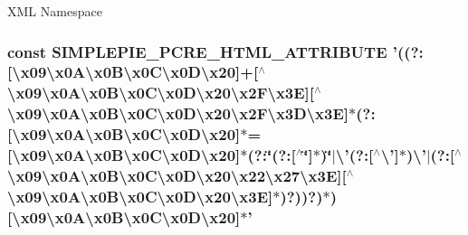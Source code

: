 X\-M\-L Namespace \hypertarget{simplepie_8inc_ae8d34a93fac87ed8c4090acddfcf9d67}{
\subsubsection[{S\-I\-M\-P\-L\-E\-P\-I\-E\-\_\-\-P\-C\-R\-E\-\_\-\-H\-T\-M\-L\-\_\-\-A\-T\-T\-R\-I\-B\-U\-T\-E}]{\setlength{\rightskip}{0pt plus 5cm}const S\-I\-M\-P\-L\-E\-P\-I\-E\-\_\-\-P\-C\-R\-E\-\_\-\-H\-T\-M\-L\-\_\-\-A\-T\-T\-R\-I\-B\-U\-T\-E '((?\-:\mbox{[}\textbackslash{}x09\textbackslash{}x0\-A\textbackslash{}x0\-B\textbackslash{}x0\-C\textbackslash{}x0\-D\textbackslash{}x20\mbox{]}+\mbox{[}$^\wedge$\textbackslash{}x09\textbackslash{}x0\-A\textbackslash{}x0\-B\textbackslash{}x0\-C\textbackslash{}x0\-D\textbackslash{}x20\textbackslash{}x2\-F\textbackslash{}x3\-E\mbox{]}\mbox{[}$^\wedge$\textbackslash{}x09\textbackslash{}x0\-A\textbackslash{}x0\-B\textbackslash{}x0\-C\textbackslash{}x0\-D\textbackslash{}x20\textbackslash{}x2\-F\textbackslash{}x3\-D\textbackslash{}x3\-E\mbox{]}$\ast$(?\-:\mbox{[}\textbackslash{}x09\textbackslash{}x0\-A\textbackslash{}x0\-B\textbackslash{}x0\-C\textbackslash{}x0\-D\textbackslash{}x20\mbox{]}$\ast$=\mbox{[}\textbackslash{}x09\textbackslash{}x0\-A\textbackslash{}x0\-B\textbackslash{}x0\-C\textbackslash{}x0\-D\textbackslash{}x20\mbox{]}$\ast$(?\-:\char`\"{}(?\-:\mbox{[}$^\wedge$\char`\"{}\mbox{]}$\ast$)\char`\"{}$|$\textbackslash{}'(?\-:\mbox{[}$^\wedge$\textbackslash{}'\mbox{]}$\ast$)\textbackslash{}'$|$(?\-:\mbox{[}$^\wedge$\textbackslash{}x09\textbackslash{}x0\-A\textbackslash{}x0\-B\textbackslash{}x0\-C\textbackslash{}x0\-D\textbackslash{}x20\textbackslash{}x22\textbackslash{}x27\textbackslash{}x3\-E\mbox{]}\mbox{[}$^\wedge$\textbackslash{}x09\textbackslash{}x0\-A\textbackslash{}x0\-B\textbackslash{}x0\-C\textbackslash{}x0\-D\textbackslash{}x20\textbackslash{}x3\-E\mbox{]}$\ast$)?))?)$\ast$)\mbox{[}\textbackslash{}x09\textbackslash{}x0\-A\textbackslash{}x0\-B\textbackslash{}x0\-C\textbackslash{}x0\-D\textbackslash{}x20\mbox{]}$\ast$'}}\label{simplepie_8inc_ae8d34a93fac87ed8c4090acddfcf9d67}
